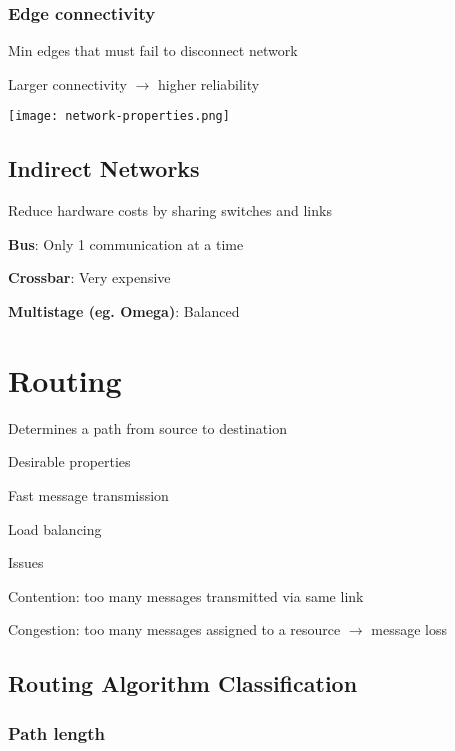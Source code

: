\documentclass[12pt]{article}
\begin{document}
\begin{spacing}{1.5}
\subsubsection{Edge connectivity}

Min edges that must fail to disconnect network

Larger connectivity $\rightarrow$ higher reliability

\texttt{[image: network-properties.png]}

\subsection{Indirect Networks}

Reduce hardware costs by sharing switches and links

\begin{itemize*}
	\item \textbf{Bus}: Only 1 communication at a time
	\item \textbf{Crossbar}: Very expensive
	\item \textbf{Multistage (eg. Omega)}: Balanced
\end{itemize*}

\section{Routing}

Determines a path from source to destination

Desirable properties

\begin{itemize*}
	\item Fast message transmission
	\item Load balancing
\end{itemize*}

Issues

\begin{itemize*}
	\item Contention: too many messages transmitted via same link
	\item Congestion: too many messages assigned to a resource $\rightarrow$ message loss
\end{itemize*}

\subsection{Routing Algorithm Classification}

\subsubsection{Path length}


\end{spacing}
\end{document}

